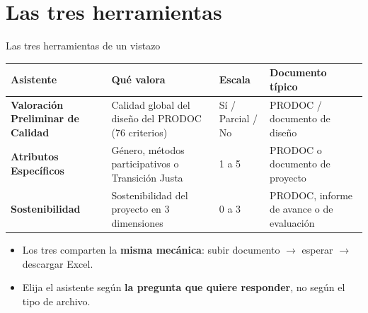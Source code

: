 \documentclass[aspectratio=169,11pt]{beamer}
\newcommand{\bluelead}[1]{\textbf{\color{iloBlue}#1}}
\begin{document}
\section{Las tres herramientas}
\begin{frame}{Las tres herramientas de un vistazo}
  \small
  \renewcommand{\arraystretch}{1.2}
  \begin{tabular}{@{}p{3.0cm}p{3.9cm}p{1.9cm}p{2.9cm}@{}}
    \toprule
    \rowcolor{iloBlue}\color{white}\textbf{Asistente} & \color{white}\textbf{Qué valora} & \color{white}\textbf{Escala} & \color{white}\textbf{Documento típico}\\
    \midrule
    \bluelead{Valoración Preliminar de Calidad} & Calidad global del diseño del PRODOC (76 criterios) & Sí / Parcial / No & PRODOC / documento de diseño\\
    \rowcolor{iloGrayLt}\bluelead{Atributos Específicos} & Género, métodos participativos o Transición Justa & 1 a 5 & PRODOC o documento de proyecto\\
    \bluelead{Sostenibilidad} & Sostenibilidad del proyecto en 3 dimensiones & 0 a 3 & PRODOC, informe de avance o de evaluación\\
    \bottomrule
  \end{tabular}
  \vspace{0.15cm}
  \begin{itemize}
    \item[\textcolor{iloRed}{\textbullet}] Los tres comparten la \bluelead{misma mecánica}: subir documento $\rightarrow$ esperar $\rightarrow$ descargar Excel.
    \item[\textcolor{iloRed}{\textbullet}] Elija el asistente según \bluelead{la pregunta que quiere responder}, no según el tipo de archivo.
  \end{itemize}
\end{frame}

\end{document}
